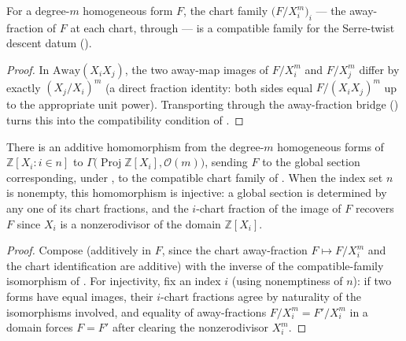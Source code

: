 \begin{lemma}\leanok
  \label{lem:serre_twist_form_compatible}
  For a degree-\(m\) homogeneous form \(F\), the chart family
  \(\bigl(F/X_i^m\bigr)_i\) --- the away-fraction of \(F\) at each chart,
  through  --- is a compatible family for the
  Serre-twist descent datum ().
\end{lemma}
\begin{proof}\leanok
  In \(\mathrm{Away}(X_i X_j)\), the two away-map images of \(F/X_i^m\) and
  \(F/X_j^m\) differ by exactly \((X_j/X_i)^m\) (a direct fraction identity:
  both sides equal \(F/(X_i X_j)^m\) up to the appropriate unit power).
  Transporting through the away-fraction bridge
  () turns this into the compatibility
  condition of .
\end{proof}

\begin{lemma}\leanok
  \label{lem:serre_twist_forms_embed}
  There is an additive homomorphism from the degree-\(m\) homogeneous forms
  of \(\mathbb Z[X_i : i \in n]\) to \(\Gamma\bigl(\operatorname{Proj}
  \mathbb Z[X_i], \mathcal O(m)\bigr)\), sending \(F\) to the global section
  corresponding, under , to the
  compatible chart family of . When the
  index set \(n\) is nonempty, this homomorphism is injective: a global
  section is determined by any one of its chart fractions, and the
  \(i\)-chart fraction of the image of \(F\) recovers \(F\) since \(X_i\) is
  a nonzerodivisor of the domain \(\mathbb Z[X_i]\).
\end{lemma}
\begin{proof}\leanok
  Compose  (additively in \(F\), since
  the chart away-fraction \(F \mapsto F/X_i^m\) and the chart identification
  are additive) with the inverse of the compatible-family isomorphism of
  . For injectivity, fix an index
  \(i\) (using nonemptiness of \(n\)): if two forms have equal images, their
  \(i\)-chart fractions agree by naturality of the isomorphisms involved,
  and equality of away-fractions \(F/X_i^m = F'/X_i^m\) in a domain forces
  \(F = F'\) after clearing the nonzerodivisor \(X_i^m\).
\end{proof}

